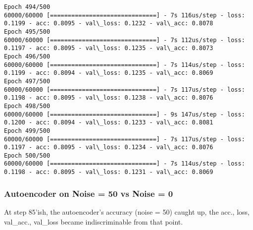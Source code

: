 \documentclass[11pt]{article}
\begin{document}
\begin{Verbatim}[commandchars=\\\{\}]
Epoch 494/500
60000/60000 [==============================] - 7s 116us/step - loss: 0.1199 - acc: 0.8095 - val\_loss: 0.1232 - val\_acc: 0.8078
Epoch 495/500
60000/60000 [==============================] - 7s 112us/step - loss: 0.1197 - acc: 0.8095 - val\_loss: 0.1235 - val\_acc: 0.8073
Epoch 496/500
60000/60000 [==============================] - 7s 114us/step - loss: 0.1199 - acc: 0.8094 - val\_loss: 0.1235 - val\_acc: 0.8069
Epoch 497/500
60000/60000 [==============================] - 7s 117us/step - loss: 0.1198 - acc: 0.8095 - val\_loss: 0.1238 - val\_acc: 0.8076
Epoch 498/500
60000/60000 [==============================] - 9s 147us/step - loss: 0.1200 - acc: 0.8094 - val\_loss: 0.1233 - val\_acc: 0.8081
Epoch 499/500
60000/60000 [==============================] - 7s 117us/step - loss: 0.1197 - acc: 0.8095 - val\_loss: 0.1234 - val\_acc: 0.8076
Epoch 500/500
60000/60000 [==============================] - 7s 114us/step - loss: 0.1198 - acc: 0.8095 - val\_loss: 0.1231 - val\_acc: 0.8069

    \end{Verbatim}

    \subsubsection{Autoencoder on Noise = 50 vs Noise =
0}\label{autoencoder-on-noise-50-vs-noise-0}

At step 85'ish, the autoencoder's accuracy (noise = 50) caught up, the
acc., loss, val\_acc., val\_loss became indiscriminable from that point.
\end{document}
